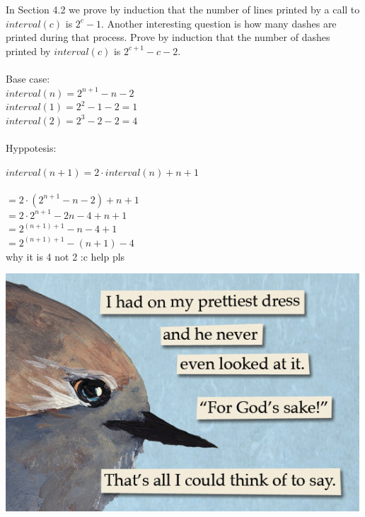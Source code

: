 \documentclass{article}
\begin{document}
In Section 4.2 we prove by induction that the number of lines printed by a call to $interval(c)$ is $2^{c} - 1$. Another interesting question is how many dashes are printed during that process. Prove by induction that the number of dashes printed by $interval(c)$ is $2^{c+1} -c-2$.\\\\

Base case:\\
$interval(n) = 2^{n+1}-n-2 $\\
$interval(1) = 2^{2}-1-2 = 1$\\
$interval(2) = 2^{3}-2-2 = 4$\\\\

Hyppotesis:


$interval(n+1) = 2\cdot interval(n)+n+1$\\\\
$= 2\cdot(2^{n+1}-n-2) + n + 1$\\
$= 2\cdot 2^{n+1}- 2n-4 +n+1$\\
$= 2^{(n+1)+1}-n-4 +1$\\
$= 2^{(n+1)+1}-(n+1)-4 $\\
why it is 4 not 2 :c help pls

\begin{center}
	\includegraphics[scale=0.5]{birb}
\end{center}
\end{document}
